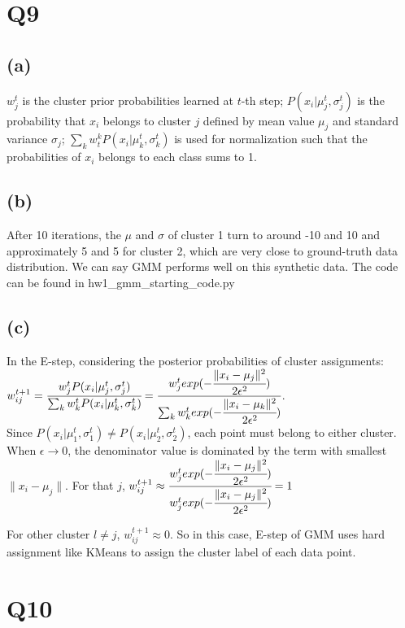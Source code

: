 \documentclass[]{article}
\begin{document}
\newpage
\section*{Q9}
\subsection*{(a)}
$w_j^t$ is the cluster prior probabilities learned at $t$-th step; $P(x_i|\mu_j^t,\sigma_j^t)$ is the probability that $x_i$ belongs to cluster $j$ defined by mean value $\mu_j$ and standard variance $\sigma_j$; $\sum_kw_t^kP(x_i|\mu_k^t,\sigma_k^t)$ is used for normalization such that the probabilities of $x_i$ belongs to each class sums to 1. 

\subsection*{(b)}
After 10 iterations, the $\mu$ and $\sigma$ of cluster 1 turn to around -10 and 10 and approximately 5 and 5 for cluster 2, which are very close to ground-truth data distribution. We can say GMM performs well on this synthetic data. 
The code can be found in hw1\_gmm\_starting\_code.py

\subsection*{(c)}
In the E-step, considering the posterior probabilities of cluster assignments: \\
$w_{ij}^{t+1}=\cfrac{w_j^tP(x_i|\mu_j^t,\sigma_j^t)}{\sum_kw_k^tP(x_i|\mu_k^t,\sigma_k^t)}=\cfrac{w_j^t exp(-\cfrac{\|x_i-\mu_j\|^2}{2\epsilon^2})}{\sum_kw_k^t exp(-\cfrac{\|x_i-\mu_k\|^2}{2\epsilon^2})}$. \\

Since $P(x_i|\mu_1^t,\sigma_1^t)\neq P(x_i|\mu_2^t,\sigma_2^t)$, each point must belong to either cluster. When $\epsilon\rightarrow 0$, the denominator value is dominated by the term with smallest $\|x_i-\mu_j\|$. For that $j$, $w_{ij}^{t+1}\approx \cfrac{w_j^t exp(-\cfrac{\|x_i-\mu_j\|^2}{2\epsilon^2})}{w_j^t exp(-\cfrac{\|x_i-\mu_j\|^2}{2\epsilon^2})}=1$

For other cluster $l\neq j$, $w_{ij}^{t+1}\approx 0$. So in this case, E-step of GMM uses hard assignment like KMeans to assign the cluster label of each data point. 

\newpage
\section*{Q10}
\end{document}
